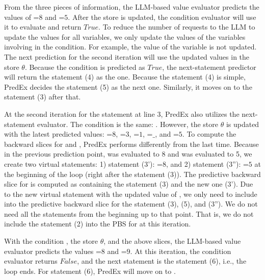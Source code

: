 From the three pieces of information, the LLM-based value evaluator
predicts the values of =$8$ and =$5$. After the store is
updated, the condition evaluator
will use it to evaluate  and return $True$. To reduce
the number of requests to the LLM to update the values for all
variables, we only update the values of the variables involving in the
condition. For example, the value of the variable  is not
updated. The next prediction for the second iteration
will use the updated values in the store $\theta$. Because the
condition is predicted as $True$, the next-statement predictor will
return the statement (4) as the one.
%
Because the statement (4) is simple, PredEx decides the
statement (5) as the next one. Similarly, it moves on to
the statement (3) after that.



At the second iteration for the  statement at line 3,
PredEx also utilizes the next-statement evaluator. The condition is
the same: . However, the store $\theta$ is updated with
the latest predicted values: =$8$, =$3$, =$1$,
=$\_$, and =$5$. To compute the backward
slices for  and , PredEx performs differently
from the last time. Because in the previous prediction point, 
was evaluated to 8 and  was evaluated to 5, we create two
virtual statements: 1) statement (3'): =$8$, and 2) statement
(3''): =$5$ at the beginning of the loop (right after the
statement (3)). The predictive backward slice for  is computed
as containing the statement (3) and the new one (3'). Due to the new
virtual statement with the updated value of , we only need
to include into the predictive backward slice for  the
statement (3), (5), and (3''). We do not need all the statements from
the beginning up to that point. That is, we do not include the
statement (2) into the PBS for  at this iteration.

With the condition , the store $\theta$, and the above
slices, the LLM-based value evaluator predicts the values =$8$
and =$9$. At this iteration, the condition evaluator
returns $False$, and the next statement is the statement (6), i.e.,
the loop ends.  For statement (6), PredEx will move on to
.

